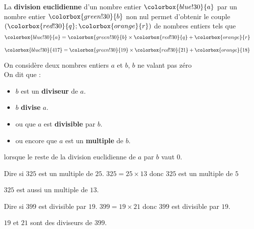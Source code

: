 \begin{propriete}[\admise]
La \textbf{division euclidienne} d'un nombre entier $\colorbox{blue!30}{a}$ par un nombre entier $\colorbox{green!30}{b}$ non nul 
permet d'obtenir le couple $(\colorbox{red!30}{q};\colorbox{orange}{r})$ de nombres entiers tels que
$$\colorbox{blue!30}{a}=\colorbox{green!30}{b}\times \colorbox{red!30}{q}+ \colorbox{orange}{r}$$
\end{propriete}

\begin{exemple*1}
$\colorbox{blue!30}{417}=\colorbox{green!30}{19}\times \colorbox{red!30}{21}+ \colorbox{orange}{18}$
\end{exemple*1}

\begin{definition}
On considère deux nombres entiers $a$ et $b$, $b$ ne valant pas zéro\\
On dit que :
\begin{itemize}
\item $b$ est un \textbf{diviseur} de $a$.
\item $b$ \textbf{divise} $a$.
\item ou que $a$ est \textbf{divisible} par $b$.
\item ou encore que $a$ est un \textbf{multiple} de $b$.
\end{itemize}
lorsque le reste de la division euclidienne de $a$ par $b$ vaut $0$.
\end{definition}

\begin{exemple}
Dire si $325$ est un multiple de $25$.
\correction 
$325=25\times13$ donc $325$ est un multiple de $5$
\end{exemple}
\begin{remarque}
	$325$ est aussi un multiple de $13$.
\end{remarque}

\begin{exemple}
	Dire si $399$ est divisible par $19$.
	\correction 
	$399=19\times21$ donc $399$ est divisible par $19$.
\end{exemple}
\begin{remarque}
	$19$ et $21$ sont des diviseurs de $399$.
\end{remarque}

